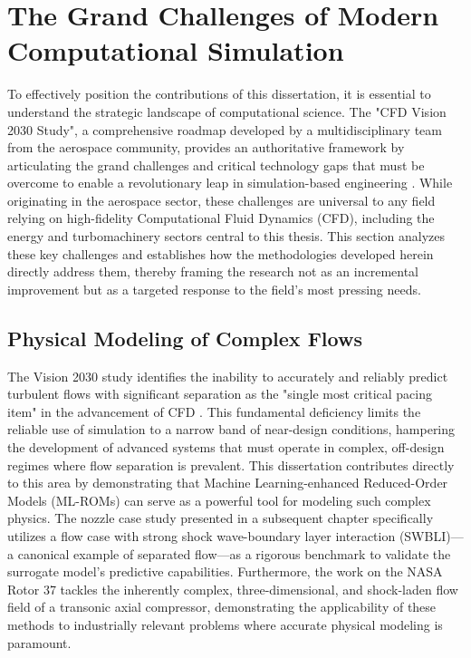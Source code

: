 \documentclass[dsc, EN]{ufabcFHZh}
\begin{document}
{\section{The Grand Challenges of Modern Computational Simulation}

To effectively position the contributions of this dissertation, it is essential to understand the strategic landscape of computational science. The "CFD Vision 2030 Study", a comprehensive roadmap developed by a multidisciplinary team from the aerospace community, provides an authoritative framework by articulating the grand challenges and critical technology gaps that must be overcome to enable a revolutionary leap in simulation-based engineering \citep{Slotnick2014}. While originating in the aerospace sector, these challenges are universal to any field relying on high-fidelity Computational Fluid Dynamics (CFD), including the energy and turbomachinery sectors central to this thesis. This section analyzes these key challenges and establishes how the methodologies developed herein directly address them, thereby framing the research not as an incremental improvement but as a targeted response to the field's most pressing needs.

\subsection{Physical Modeling of Complex Flows}

The Vision 2030 study identifies the inability to accurately and reliably predict turbulent flows with significant separation as the "single most critical pacing item" in the advancement of CFD \citep{Slotnick2014}. This fundamental deficiency limits the reliable use of simulation to a narrow band of near-design conditions, hampering the development of advanced systems that must operate in complex, off-design regimes where flow separation is prevalent. This dissertation contributes directly to this area by demonstrating that Machine Learning-enhanced Reduced-Order Models (ML-ROMs) can serve as a powerful tool for modeling such complex physics. The nozzle case study presented in a subsequent chapter specifically utilizes a flow case with strong shock wave-boundary layer interaction (SWBLI)—a canonical example of separated flow—as a rigorous benchmark to validate the surrogate model's predictive capabilities. Furthermore, the work on the NASA Rotor 37 tackles the inherently complex, three-dimensional, and shock-laden flow field of a transonic axial compressor, demonstrating the applicability of these methods to industrially relevant problems where accurate physical modeling is paramount.

}
\end{document}
